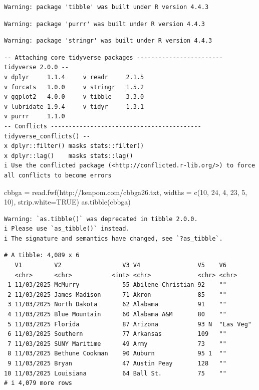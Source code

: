 \documentclass[
  letterpaper,
  DIV=11,
  numbers=noendperiod]{scrartcl}
\newenvironment{Shaded}{\begin{snugshade}}{\end{snugshade}}
\newcommand{\AttributeTok}[1]{\textcolor[rgb]{0.40,0.45,0.13}{#1}}
\newcommand{\ConstantTok}[1]{\textcolor[rgb]{0.56,0.35,0.01}{#1}}
\newcommand{\DecValTok}[1]{\textcolor[rgb]{0.68,0.00,0.00}{#1}}
\newcommand{\FunctionTok}[1]{\textcolor[rgb]{0.28,0.35,0.67}{#1}}
\newcommand{\NormalTok}[1]{\textcolor[rgb]{0.00,0.23,0.31}{#1}}
\newcommand{\OtherTok}[1]{\textcolor[rgb]{0.00,0.23,0.31}{#1}}
\newcommand{\StringTok}[1]{\textcolor[rgb]{0.13,0.47,0.30}{#1}}
\begin{document}
\begin{verbatim}
Warning: package 'tibble' was built under R version 4.4.3
\end{verbatim}

\begin{verbatim}
Warning: package 'purrr' was built under R version 4.4.3
\end{verbatim}

\begin{verbatim}
Warning: package 'stringr' was built under R version 4.4.3
\end{verbatim}

\begin{verbatim}
-- Attaching core tidyverse packages ------------------------ tidyverse 2.0.0 --
v dplyr     1.1.4     v readr     2.1.5
v forcats   1.0.0     v stringr   1.5.2
v ggplot2   4.0.0     v tibble    3.3.0
v lubridate 1.9.4     v tidyr     1.3.1
v purrr     1.1.0     
-- Conflicts ------------------------------------------ tidyverse_conflicts() --
x dplyr::filter() masks stats::filter()
x dplyr::lag()    masks stats::lag()
i Use the conflicted package (<http://conflicted.r-lib.org/>) to force all conflicts to become errors
\end{verbatim}

\begin{Shaded}
\begin{Highlighting}[]
\NormalTok{cbbga }\OtherTok{=} \FunctionTok{read.fwf}\NormalTok{(}\StringTok{\textquotesingle{}http://kenpom.com/cbbga26.txt\textquotesingle{}}\NormalTok{, }\AttributeTok{widths =} \FunctionTok{c}\NormalTok{(}\DecValTok{10}\NormalTok{, }\DecValTok{24}\NormalTok{, }\DecValTok{4}\NormalTok{, }\DecValTok{23}\NormalTok{, }\DecValTok{5}\NormalTok{, }\DecValTok{10}\NormalTok{), }\AttributeTok{strip.white=}\ConstantTok{TRUE}\NormalTok{)}
\FunctionTok{as.tibble}\NormalTok{(cbbga)}
\end{Highlighting}
\end{Shaded}

\begin{verbatim}
Warning: `as.tibble()` was deprecated in tibble 2.0.0.
i Please use `as_tibble()` instead.
i The signature and semantics have changed, see `?as_tibble`.
\end{verbatim}

\begin{verbatim}
# A tibble: 4,089 x 6
   V1         V2                 V3 V4                V5    V6       
   <chr>      <chr>           <int> <chr>             <chr> <chr>    
 1 11/03/2025 McMurry            55 Abilene Christian 92    ""       
 2 11/03/2025 James Madison      71 Akron             85    ""       
 3 11/03/2025 North Dakota       62 Alabama           91    ""       
 4 11/03/2025 Blue Mountain      60 Alabama A&M       80    ""       
 5 11/03/2025 Florida            87 Arizona           93 N  "Las Veg"
 6 11/03/2025 Southern           77 Arkansas          109   ""       
 7 11/03/2025 SUNY Maritime      49 Army              73    ""       
 8 11/03/2025 Bethune Cookman    90 Auburn            95 1  ""       
 9 11/03/2025 Bryan              47 Austin Peay       128   ""       
10 11/03/2025 Louisiana          64 Ball St.          75    ""       
# i 4,079 more rows
\end{verbatim}
\end{document}
